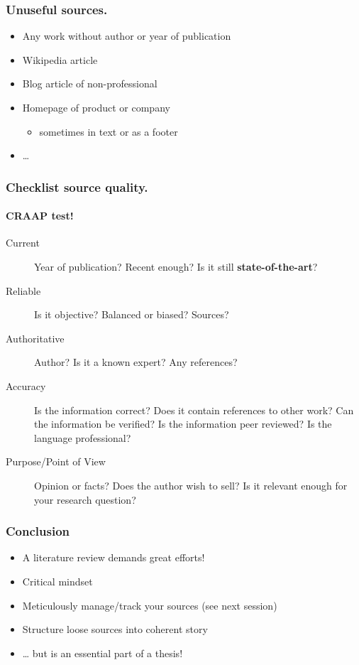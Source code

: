 \documentclass[aspectratio=169]{beamer}
\begin{document}
\begin{frame}
    \frametitle{Unuseful sources.}

    \begin{itemize}
        \item Any work without author or year of publication
        \item Wikipedia article
        \item Blog article of non-professional
        \item Homepage of product or company
              \begin{itemize}
                  \item sometimes in text or as a footer
              \end{itemize}
        \item \dots
    \end{itemize}
\end{frame}

\begin{frame}
    \frametitle{Checklist source quality.}
    \framesubtitle{CRAAP test!}

    \begin{description}
        \item[Current] Year of publication? Recent enough? Is it still \textbf{state-of-the-art}?
        \item[Reliable] Is it objective? Balanced or biased? Sources?
        \item[Authoritative] Author? Is it a known expert? Any references?
        \item[Accuracy] Is the information correct? Does it contain references to other work? Can the information be verified? Is the information peer reviewed? Is the language professional?
        \item[Purpose/Point of View] Opinion or facts? Does the author wish to sell? Is it relevant enough for your research question?
    \end{description}

\end{frame}

\begin{frame}
    \frametitle{Conclusion}

    \begin{itemize}
        \item A literature review demands great efforts!
        \item Critical mindset
        \item Meticulously manage/track your sources (see next session)
        \item Structure loose sources into coherent story
        \item \ldots{} but is an essential part of a thesis!
    \end{itemize}

\end{frame}
\end{document}
